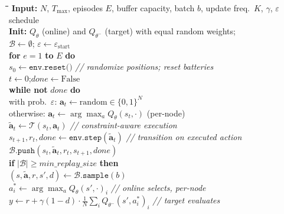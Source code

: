 \documentclass[journal]{IEEEtran}
\begin{document}
\begin{algorithm}[!t]
\caption{DDQN-WSN Training Procedure\label{alg:ddqn_wsn}}
\footnotesize
\begin{tabbing}
\hspace{1.6em}\=\hspace{1.6em}\=\hspace{1.6em}\=\hspace{20em}\=\kill
\textbf{Input:} $N$, $T_{\max}$, episodes $E$, buffer capacity,
  batch $b$, update freq.\ $K$, $\gamma$, $\varepsilon$ schedule\\
\textbf{Init:} $Q_\theta$ (online) and $Q_{\theta^-}$ (target)
  with equal random weights;\\
\> $\mathcal{B} \leftarrow \emptyset$;\quad
  $\varepsilon \leftarrow \varepsilon_{\mathrm{start}}$\\[2pt]
\textbf{for} $e = 1$ \textbf{to} $E$ \textbf{do}\\
\> $s_0 \leftarrow \texttt{env.reset()}$
  \`\textit{// randomize positions; reset batteries}\\
\> $t \leftarrow 0$;\quad $\mathit{done} \leftarrow \mathrm{False}$\\
\> \textbf{while not} $\mathit{done}$ \textbf{do}\\
\>\> with prob.\ $\varepsilon$:\quad
     $\mathbf{a}_t \leftarrow \mathrm{random} \in \{0,1\}^N$\\
\>\> otherwise:\quad
     $\mathbf{a}_t \leftarrow \arg\max_{a} Q_\theta(s_t,\cdot)$
     (per-node)\\
\>\> $\tilde{\mathbf{a}}_t \leftarrow
     \mathcal{T}(s_t,\mathbf{a}_t)$
  \`\textit{// constraint-aware execution}\\
\>\> $s_{t+1}, r_t, \mathit{done}
     \leftarrow \texttt{env.step}(\tilde{\mathbf{a}}_t)$
  \`\textit{// transition on executed action}\\
\>\> $\mathcal{B}.\texttt{push}(s_t,\tilde{\mathbf{a}}_t,r_t,s_{t+1},
     \mathit{done})$\\
\>\> \textbf{if} $|\mathcal{B}| \geq \mathit{min\_replay\_size}$
     \textbf{then}\\
\>\>\> $(s,\tilde{\mathbf{a}},r,s',d) \leftarrow
       \mathcal{B}.\texttt{sample}(b)$\\
\>\>\> $a_i^* \leftarrow \arg\max_{a} Q_\theta(s',\cdot)_i$
  \`\textit{// online selects, per-node}\\
\>\>\> $y \leftarrow r + \gamma(1{-}d)\cdot
       \tfrac{1}{N}\sum_i Q_{\theta^-}(s',a_i^*)_i$
  \`\textit{// target evaluates}\\

\end{tabbing}
\end{algorithm}
\end{document}
